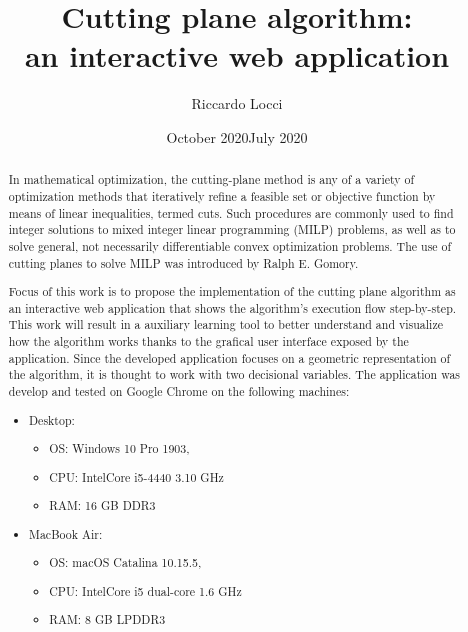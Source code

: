 \documentclass[9pt]{extarticle}
\title{Cutting plane algorithm: \\ an interactive web application}
\date{October 2020}
\date{July 2020}
\author{Riccardo Locci}
\begin{document}
    \maketitle
        
    \begin{abstract} 
        In mathematical optimization, the cutting-plane method is any of a variety of optimization methods that iteratively 
        refine a feasible set or objective function by means of linear inequalities, termed cuts. 
        Such procedures are commonly used to find integer solutions to mixed integer linear programming (MILP) problems, 
        as well as to solve general, not necessarily differentiable convex optimization problems. The use of cutting planes 
        to solve MILP was introduced by Ralph E. Gomory.\cite{wiki:cuttingplane} 

        Focus of this work is to propose the implementation of the cutting plane algorithm as an interactive web application
        that shows the algorithm's execution flow step-by-step.
        This work will result in a auxiliary learning tool to better understand and visualize how the algorithm works
        thanks to the grafical user interface exposed by the application.
        Since the developed application focuses on a geometric representation of the algorithm, it is thought to work
        with two decisional variables.
        The application was develop and tested on Google Chrome on the following machines:
        
        \begin{itemize}
            \item Desktop:
            \begin{itemize} 
                \item OS: Windows 10 Pro 1903, 
                \item CPU: Intel\textregistered Core i5-4440 3.10 GHz
                \item RAM: 16 GB DDR3 
            \end{itemize}
            \item MacBook Air:
            \begin{itemize} 
                \item OS: macOS Catalina 10.15.5, 
                \item CPU: Intel\textregistered Core i5 dual-core 1.6 GHz
                \item RAM: 8 GB LPDDR3 
            \end{itemize}
        \end{itemize}
    \end{abstract}
\end{document}
